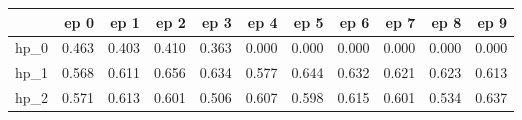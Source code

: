 \begin{tabular}{lrrrrrrrrrr}
\toprule
{} &   ep 0 &   ep 1 &   ep 2 &   ep 3 &   ep 4 &   ep 5 &   ep 6 &   ep 7 &   ep 8 &   ep 9 \\
\midrule
hp\_0 &  0.463 &  0.403 &  0.410 &  0.363 &  0.000 &  0.000 &  0.000 &  0.000 &  0.000 &  0.000 \\
hp\_1 &  0.568 &  0.611 &  0.656 &  0.634 &  0.577 &  0.644 &  0.632 &  0.621 &  0.623 &  0.613 \\
hp\_2 &  0.571 &  0.613 &  0.601 &  0.506 &  0.607 &  0.598 &  0.615 &  0.601 &  0.534 &  0.637 \\
\bottomrule
\end{tabular}
